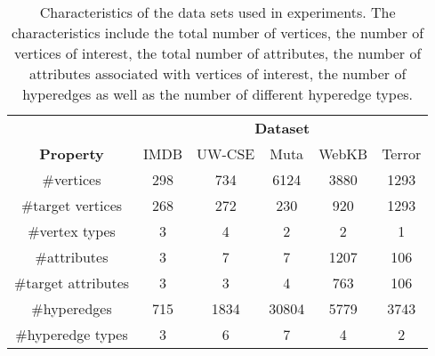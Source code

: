\begin{table}
\captionsetup{justification=justified}
\begin{center}
\caption{Characteristics of the data sets used in experiments. The characteristics include the total number of vertices, the number of vertices of interest, the total number of attributes, the number of attributes associated with vertices of interest, the number of hyperedges as well as the number of different hyperedge types.}
\label{tab:Data}
\begin{tabular}[t]{@{}cccccc@{}}


		\toprule
						  & \multicolumn{5}{c}{\textbf{Dataset}} \\
						  \cmidrule{2-6}
		\textbf{Property} & IMDB   & UW-CSE & Muta & WebKB & Terror \\
		\midrule
		\#vertices & 298  & 734 & 6124 & 3880  & 1293\\

		\#target vertices & 268 & 272  & 230 & 920  & 1293 \\

		\#vertex types & 3  & 4 & 2  & 2  & 1 \\

		\#attributes & 3   & 7 & 7 & 1207  & 106 \\

		\#target attributes & 3  & 3 & 4 & 763  & 106\\

		\#hyperedges & 715  & 1834 & 30804 & 5779  & 3743\\

		\#hyperedge types  & 3   & 6 & 7 & 4 & 2 \\
		\bottomrule


\end{tabular}
\end{center}

\end{table}


